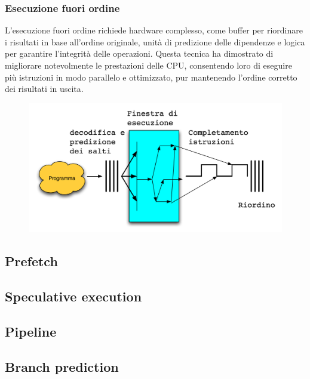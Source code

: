 \begin{frame}
	\frametitle{ Esecuzione fuori ordine}

		L'esecuzione fuori ordine richiede hardware complesso, come buffer per riordinare i risultati in base all'ordine originale, unità di predizione delle dipendenze e logica per garantire l'integrità delle operazioni. Questa tecnica ha dimostrato di migliorare notevolmente le prestazioni delle CPU, consentendo loro di eseguire più istruzioni in modo parallelo e ottimizzato, pur mantenendo l'ordine corretto dei risultati in uscita.%
		
		
		\begin{figure}[!htbp]
			\centering 
			\includegraphics[width=0.7\linewidth]{images/7_pipeline/superscalar_processor.png}
			\label{fig:pipeline_superscalar_processor}
		\end{figure}

\end{frame}



\subsection[Prefetch]{Prefetch}
\subsection[Speculative execution]{Speculative execution}
\subsection[Pipeline]{Pipeline}
\subsection[Branch prediction]{Branch prediction}
